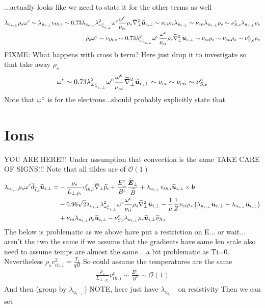 ...actually looks like we need to state it for the other terms as well
%
\begin{align*}
 \lambda_{u_{e,\perp}}
 \rho_s
 \om^c
%
 \sim
 \lambda_{u_{e,\perp}}
 v_{th,e}
%
 \sim
0.73
 \lambda_{u_{e,\perp}}
\lambda_{\om^c_{u_{e,\perp}}}^2
 \om^c
\frac{\om^c}{\nu_{ei} }
\rho_s
\wt{\grad}_\perp^2\wt{\ve{u}}_{e,\perp}
%
 \sim
\nu_{ei}
\rho_s
\lambda_{u_{e,\perp}}
%
 \sim
\nu_{e n}\lambda_{u_{e,\perp}}\rho_s
%
 \sim
\nu^c_{S,e}\lambda_{u_{e,\perp}}\rho_s
\\
%
%
%
 \rho_s
 \om^c
%
 \sim
 v_{th,e}
%
 \sim
0.73
\lambda_{\om^c_{u_{e,\perp}}}^2
 \om^c
\frac{\om^c}{\nu_{ei} }
\rho_s
\wt{\grad}_\perp^2\wt{\ve{u}}_{e,\perp}
%
 \sim
\nu_{ei}
\rho_s
%
 \sim
\nu_{e n}
\rho_s
%
 \sim
\nu^c_{S,e}
\rho_s
\\
\end{align*}
%
FIXME: What happens with cross b term? Here just drop it to investigate
so that take away $\rho_s$
%
\begin{align*}
 \om^c
%
 \sim
0.73
\lambda_{\om^c_{u_{e,\perp}}}^2
 \om^c
\frac{\om^c}{\nu_{ei} }
\wt{\grad}_\perp^2\wt{\ve{u}}_{e,\perp}
%
 \sim
\nu_{ei}
%
 \sim
\nu_{e n}
%
 \sim
\nu^c_{S,e}
\end{align*}
%
Note that $\omega^c$ is for the electrons...should probably explicitly state that

\section{Ions}
%
YOU ARE HERE!!!
Under assumption that convection is the same
TAKE CARE OF SIGNS!!!
Note that all tildes are of $\mathcal{O}(1)$
%
\begin{align*}
 \lambda_{u_{i,\perp}}
 \rho_s
 \omega^c
 \widetilde{ \text{d}}_{\widetilde{ t},i} \widetilde{ \boldsymbol{u}}_{i,\perp}
 =&
 -
 \frac{\rho_s}{L_{\perp, p_i}}v^c_{th,i}
 \widetilde{ \nabla}_\perp \widetilde{ p_i}
 +
 \frac{E_\perp^c}{B^c}
 \frac{\widetilde{ \boldsymbol{E}}_\perp}{\widetilde{ B}}
 +
 \lambda_{u_{i,\perp}}
 v_{th,i}
 \widetilde{ \boldsymbol{u}}_{i,\perp}\times\boldsymbol{b}
 \\&
 -
0.96\sqrt{2}
 \lambda_{u_{i,\perp}}
\lambda_{\omega^c_{u_{i,\perp}}}^2
 \omega^c
\frac{\omega^c}{\nu_{ii} }
\rho_s
\widetilde{ \nabla}_\perp^2\widetilde{ \boldsymbol{u}}_{i,\perp}
-
\frac{1}{\mu}
\frac{1}{Z}
\nu_{ei}
\rho_s
\left( \lambda_{u_{e,\perp}}\widetilde{ \boldsymbol{u}}_{e,\perp}-\lambda_{u_{i,\perp}}\widetilde{ \boldsymbol{u}}_{i,\perp}\right)
 \\&
 +
\nu_{i n}\lambda_{u_{i,\perp}}\rho_s\widetilde{ \boldsymbol{u}}_{i,\perp}
-
\nu^c_{S,i}\lambda_{u_{i,\perp}}\rho_s\widetilde{ \boldsymbol{u}}_{i,\perp} \widetilde{ \nu}_{S,i}
\end{align*}
%
The below is problematic as we above have put a restriction on E...
or wait...
aren't the two the same if we assume that the gradients have same len scale
also need to assume temps are almost the same...
a bit problematic as Ti=0.
Nevertheless
$\rho_sv_{th,i}^2=\frac{T_i}{qB}$
So could assume the temperatures are the same
%
\begin{align*}
 \frac{\rho_s}{L_{\perp, p_i}}v^c_{th,i}
 \sim
 \frac{E_\perp^c}{B^c}
 \sim
 \mathcal{O}(1)
\end{align*}
%
And then (group by $\lambda_{u_{i,\perp}}$)
NOTE, here just have $\lambda_{u_{i,\perp}}$ on resistivity
Then we can set

